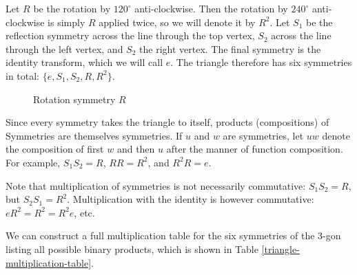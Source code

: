 Let $R$ be the rotation by $120^\circ$ anti-clockwise. Then the rotation by $240^\circ$ anti-clockwise is simply $R$ applied twice, so we will denote it by $R^2$. Let $S_1$ be the reflection symmetry across the line through the top vertex, $S_2$ across the line through the left vertex, and $S_2$ the right vertex. The final symmetry is the identity transform, which we will call $e$. The triangle therefore has six symmetries in total: $\{e, S_1, S_2, R, R^2\}$.

\begin{figure}[ht!]
    \centering
\caption{Rotation symmetry $R$}
\label{fig:triangle-rotation}
\end{figure}

Since every symmetry takes the triangle to itself, products (compositions) of Symmetries are themselves symmetries. If $u$ and $w$ are symmetries, let $uw$ denote the composition of first $w$ and then $u$ after the manner of function composition. For example, $S_1S_2 = R$, $RR = R^2$, and $R^2R = e$.

Note that multiplication of symmetries is not necessarily commutative: $S_1S_2 = R$, but $S_2S_1 = R^2$. Multiplication with the identity is however commutative: $eR^2 = R^2 = R^2e$, etc.

We can construct a full multiplication table for the six symmetries of the $3$-gon listing all possible binary products, which is shown in Table \ref{triangle-multiplication-table}.

